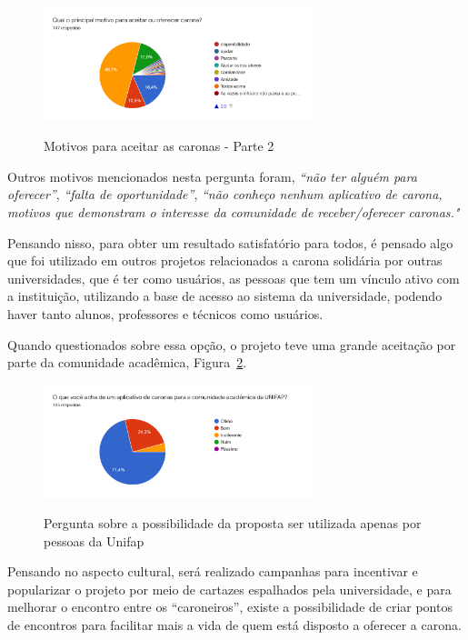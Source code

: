 \begin{figure}[!hbtp]
	\centering
	\caption{Motivos para aceitar as caronas - Parte 2}
	\includegraphics[width=0.7\textwidth]{./04-figuras/questionario/4.png}
	\label{fig:aceitacaopelascaronas2}
\end{figure}

Outros motivos mencionados nesta pergunta foram, \textit{“não ter alguém para oferecer”}, \textit{“falta de oportunidade”}, \textit{“não conheço nenhum aplicativo de carona, motivos que demonstram o interesse da comunidade de receber/oferecer caronas."}

Pensando nisso, para obter um resultado satisfatório para todos, é pensado algo que foi utilizado em outros projetos relacionados a carona solidária por outras universidades, que é ter como usuários, as pessoas que tem um vínculo ativo com a instituição, utilizando a base de acesso ao sistema da universidade, podendo haver tanto alunos, professores e técnicos como usuários.

Quando questionados sobre essa opção, o projeto teve uma grande aceitação por parte da comunidade acadêmica, Figura~\ref{fig:aceitacao}.%

\begin{figure}[!hbtp]
	\centering
	\caption{Pergunta sobre a possibilidade da proposta ser utilizada apenas por pessoas da Unifap}
	\includegraphics[width=0.7\textwidth]{./04-figuras/questionario/5.png}
	\label{fig:aceitacao}
\end{figure}

Pensando no aspecto cultural, será realizado campanhas para incentivar e popularizar o projeto por meio de cartazes espalhados pela universidade, e para melhorar o encontro entre os “caroneiros”, existe a possibilidade de criar pontos de encontros para facilitar mais a vida de quem está disposto a oferecer a carona.

